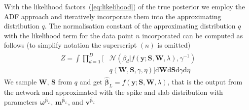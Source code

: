 \documentclass[letterpaper]{article}
\begin{document}
With the likelihood factors~(\ref{eq:likelihood}) of the true posterior we employ the ADF approach and iteratively incorporate them into the approximating distribution $q$. The normalisation constant of the approximating distribution $q$ with the likelihood term for the data point $n$ incorporated can be computed as follows (to simplify notation the superscript $(n)$ is omitted)
\begin{align}
\label{eq:Z}
\begin{split}
Z = \int \prod_{d=1}^{D} \big[&\mathcal{N}(\beta_d | f(\mathbf{y} ; \mathbf{S}, \mathbf{W}, \lambda), \gamma^{-1}) \\
 &q(\mathbf{W}, \mathbf{S}, \gamma, \eta)\big] \mathrm{d}\mathbf{W} \mathrm{d}\mathbf{S} \mathrm{d}\gamma \mathrm{d}\eta
 \end{split}
\end{align}
We sample $\mathbf{W}$, $\mathbf{S}$ from $q$ and get $\widehat{\boldsymbol\beta}_L = f(\mathbf{y} ; \mathbf{S}, \mathbf{W}, \lambda)$, that is the output from the network and approximated with the spike and slab distribution with parameters $\boldsymbol\omega^{\widehat{\boldsymbol\beta}_L}$, $\mathbf{m}^{\widehat{\boldsymbol\beta}_L}$, and $\mathbf{v}^{\widehat{\boldsymbol\beta}_L}$
\end{document}
